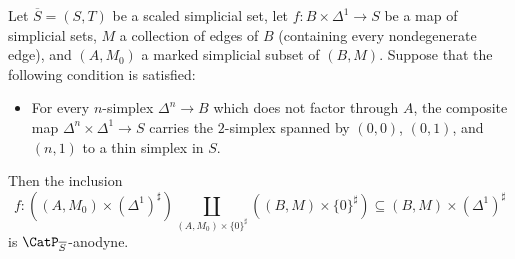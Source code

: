 


\begin{lemma}\label{kappus}
Let $\overline{S} = (S,T)$ be a scaled simplicial set, let
$f: B \times \Delta^1 \rightarrow S$ be a map of simplicial sets, $M$ a collection of edges of $B$ (containing every nondegenerate edge), and $(A,M_0)$ a marked simplicial subset of $(B,M)$.
Suppose that the following condition is satisfied:
\begin{itemize}
\item[$(\ast)$] For every $n$-simplex $\Delta^n \rightarrow B$ which does not factor through $A$, the composite map $\Delta^n \times \Delta^1 \rightarrow S$
carries the $2$-simplex spanned by $(0,0)$, $(0,1)$, and $(n,1)$ to a thin simplex in $S$.
\end{itemize}
Then the inclusion 
$$ f: ((A,M_0) \times (\Delta^{1})^{\sharp})
\coprod_{ (A,M_0) \times \{0\}^{\sharp} } ((B,M) \times \{0\}^{\sharp} )
\subseteq (B,M) \times (\Delta^1)^{\sharp}$$
is $\CatP_{\overline{S}}$-anodyne.
\end{lemma}

